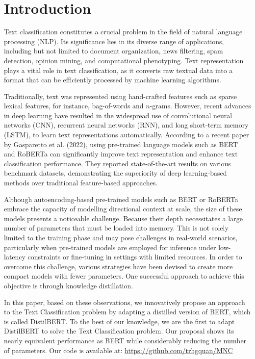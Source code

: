\documentclass[sn-mathphys,Numbered]{sn-jnl}%
\theoremstyle{thmstyleone}%
\theoremstyle{thmstyletwo}%
\theoremstyle{thmstylethree}%
\begin{document}
\section{Introduction}\label{introduction}
Text classification constitutes a crucial problem in the field of natural language processing (NLP). Its significance lies in its diverse range of applications, including but not limited to document organization, news filtering, spam detection, opinion mining, and computational phenotyping\cite{Aggarwal2012, Zeng2019}. Text representation plays a vital role in text classification, as it converts raw textual data into a format that can be efficiently processed by machine learning algorithms. 

Traditionally, text was represented using hand-crafted features such as sparse lexical features, for instance, bag-of-words and $n$-grams. However, recent advances in deep learning have resulted in the widespread use of convolutional neural networks (CNN)\cite{LeCun1998}, recurrent neural networks (RNN)\cite{Rumelhart1987}, and long short-term memory (LSTM)\cite{Hochreiter1997}, to learn text representations automatically. According to a recent paper by Gasparetto et al. (2022)\cite{Gasparetto2022}, using pre-trained language models such as BERT\cite{Devlin2019} and RoBERTa\cite{Liu2019} can significantly improve text representation and enhance text classification performance. They reported state-of-the-art results on various benchmark datasets, demonstrating the superiority of deep learning-based methods over traditional feature-based approaches.

Although autoencoding-based pre-trained models such as BERT or RoBERTa embrace the capacity of modelling directional context at scale, the size of these models presents a noticeable challenge. Because their depth necessitates a large number of parameters that must be loaded into memory. This is not solely limited to the training phase and may pose challenges in real-world scenarios, particularly when pre-trained models are employed for inference under low-latency constraints or fine-tuning in settings with limited resources. In order to overcome this challenge, various strategies have been devised to create more compact models with fewer parameters. One successful approach to achieve this objective is through knowledge distillation. 

In this paper, based on these observations, we innovatively propose an approach to the Text Classification problem by adapting a distilled version of BERT, which is called DistilBERT\cite{Sanh2019}. To the best of our knowledge, we are the first to adapt DistilBERT to solve the Text Classification problem. Our proposal shows its nearly equivalent performance as BERT while considerably reducing the number of parameters. Our code is available at: \href{https://github.com/trhgquan/MNC}{https://github.com/trhgquan/MNC}
\end{document}
